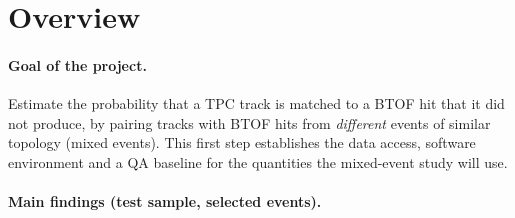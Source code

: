 \section{Overview}
\label{sec:overview}

\paragraph{Goal of the project.} Estimate the probability that a TPC track is matched to a BTOF hit
that it did not produce, by pairing tracks with BTOF hits from \emph{different} events of similar
topology (mixed events). This first step establishes the data access, software environment and
a QA baseline for the quantities the mixed-event study will use.

\paragraph{Main findings (test sample, \nEvtSel{} selected events).}
